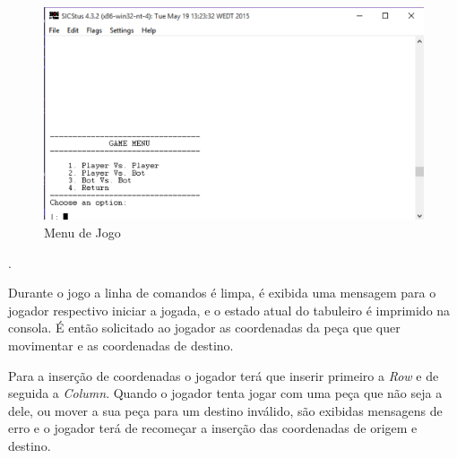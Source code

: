 \documentclass[a4paper]{article}
\begin{document}
\begin{figure}[h!]
\begin{center}
\hspace*{-0.5cm}\includegraphics[scale=1]{menu2.png}
\caption{Menu de Jogo}
\end{center}
\end{figure}

.\linebreak\linebreak\linebreak\linebreak\linebreak\linebreak\linebreak
\par Durante o jogo a linha de comandos é limpa, é exibida uma mensagem para o jogador respectivo iniciar a jogada, e o estado atual do tabuleiro é imprimido na consola. É então solicitado ao jogador as coordenadas da peça que quer movimentar e as coordenadas de destino. 
\par Para a inserção de coordenadas o jogador terá que inserir primeiro a \textit{Row} e de seguida a \textit{Column}. Quando o jogador tenta jogar com uma peça que não seja a dele, ou mover a sua peça para um destino inválido, são exibidas mensagens de erro e o jogador terá de recomeçar a inserção das coordenadas de origem e destino. 
\end{document}

